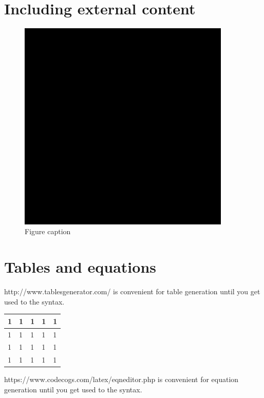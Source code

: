 \documentclass[12pt]{report}
\begin{document}
\section{Including external content}
\label{sec:content}
\begin{figure}[H] 
  \centering
    \includegraphics[width=0.9\textwidth]{Figures/example}
      \caption{Figure caption}
      \label{fig:example}
\end{figure}



\section{Tables and equations}
http://www.tablesgenerator.com/ is convenient for table generation until you get
used to the syntax.
\begin{table}[H]
\label{tab:example}
\begin{tabular}{|l|l|l|l|l|}
\hline
1 & 1 & 1 & 1 & 1 \\ \hline
1 & 1 & 1 & 1 & 1 \\ \hline
1 & 1 & 1 & 1 & 1 \\ \hline
1 & 1 & 1 & 1 & 1 \\ \hline
\end{tabular}
\end{table}

https://www.codecogs.com/latex/eqneditor.php is convenient for equation generation
until you get used to the syntax.
\end{document}
